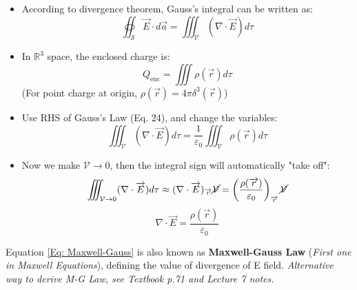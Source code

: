\documentclass[12pt,a4paper,twoside]{article}
\numberwithin{equation}{section}
\begin{document}
    \begin{itemize}
        \item According to divergence theorem, Gauss's integral can be written as:
        \[\oiint_\mathcal{S}\overrightarrow{E}\cdot d\overrightarrow{a}=\iiint_{\mathcal{V}}(\nabla\cdot \overrightarrow{E})d\tau\]
        
        \item In $\mathbb{R}^3$ space, the enclosed charge is:
        \[Q_{\mathrm{enc}}=\iiint \rho(\overrightarrow{r})d\tau\]
        (For point charge at origin, $\rho(\overrightarrow{r})=4\pi\delta^3(\overrightarrow{r})$)
        
        \item Use RHS of Gauss's Law (Eq. 24), and change the variables:
        \[\iiint_{\mathcal{V}}(\nabla\cdot \overrightarrow{E})d\tau=\frac{1}{\varepsilon_0}\iiint_{\mathcal{V}}\rho(\overrightarrow{r})d\tau\]
        
        \item Now we make $\mathcal{V}\to 0$, then the integral sign will automatically "take off":
        \[\iiint_{\mathcal{V}\to 0}(\nabla\cdot \overrightarrow{E})d\tau\approx (\nabla\cdot\overrightarrow{E})_{\overrightarrow{r}}\cancel{\mathcal{V}}=\left(\frac{\rho(\overrightarrow{r})}{\varepsilon_0}\right)_{\overrightarrow{r}}\cancel{\mathcal{V}}\]
        \begin{equation}
            \nabla \cdot \overrightarrow{E} = \frac{\rho(\overrightarrow{r})}{\varepsilon_0}
            \label{Eq: Maxwell-Gauss}
        \end{equation}
    \end{itemize}
    Equation \ref{Eq: Maxwell-Gauss} is also known as \textbf{Maxwell-Gauss Law} (\textit{First one in Maxwell Equations}), defining the value of divergence of E field. \textit{Alternative way to derive M-G Law, see Textbook p.71 and Lecture 7 notes.}
\end{document}
